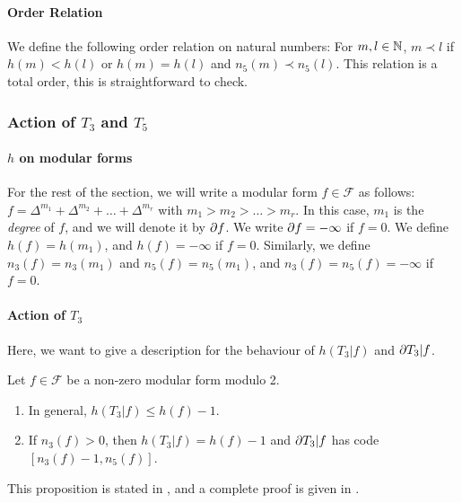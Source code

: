 \paragraph{Order Relation}
We define the following order relation on natural numbers:
For $m, l \in \mathbb{N}$, $m \prec l$ if $h(m) < h(l)$ or $h(m) = h(l)$ and $n_5(m) \prec n_5(l)$.
This relation is a total order, this is straightforward to check.

\subsubsection{Action of $T_3$ and $T_5$}
\paragraph{$h$ on modular forms}
For the rest of the section, we will write a modular form $f \in \mathcal{F}$ as follows:
$f = \Delta^{m_1} + \Delta^{m_2} + \dots + \Delta^{m_r}$ with $m_1 > m_2 > \dots > m_r$.
In this case, $m_1$ is the \textit{degree} of $f$, and we will denote it by $\partial f$.
We write $\partial f = -\infty$ if $f=0$.
We define $h(f) = h(m_1)$, and $h(f) = -\infty$ if $f=0$.
Similarly, we define $n_3(f) = n_3(m_1)$ and $n_5(f) = n_5(m_1)$, and $n_3(f) = n_5(f) = -\infty$ if $f=0$.

\paragraph{Action of $T_3$}
Here, we want to give a description for the behaviour of $h(T_3|f)$ and $\partial T_3|f$.
\label{propositionActionT3}
\begin{proposition}
	Let $f \in \mathcal{F}$ be a non-zero modular form modulo 2.
	\begin{enumerate}
		\item In general, $h(T_3|f) \leq h(f)-1$.
		\item If $n_3(f)>0$, then $h(T_3|f) = h(f)-1$ and $\partial T_3|f$ has code $\left[ n_3(f)-1, n_5(f) \right] $.
	\end{enumerate}
\end{proposition}
This proposition is stated in \cite[§4]{OrdreNilpotenceOperateurHecke}, and a complete proof is given in \cite{ModularFormsMcGill}.


